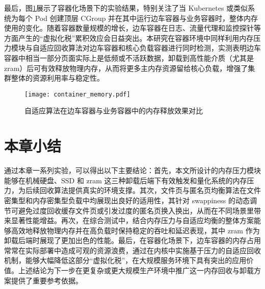 最后，图\ref{fig:container_memory}展示了容器化场景下的实验结果，特别关注了当 Kubernetes 或类似系统为每个 Pod 创建顶层 CGroup 并在其中运行边车容器与业务容器时，整体内存使用的变化。随着容器数量规模的增长，边车容器在日志、流量代理和监控探针等方面产生的“虚拟化税”累积效应会日益突出。本研究在容器环境中同样利用内存压力模块与自适应回收算法对边车容器和核心负载容器进行同时检测，实测表明边车容器中相当一部分页面实际上是低频或不活跃数据，卸载到高性能介质（尤其是 zram）后可有效释放物理内存，从而将更多主内存资源留给核心负载，增强了集群整体的资源利用率与稳定性。

\begin{figure}[htbp]
    \centering
    \texttt{[image: container\_memory.pdf]}
    \caption{自适应算法在边车容器与业务容器中的内存释放效果对比}
    \label{fig:container_memory}
\end{figure}

\section{本章小结}

通过本章一系列实验，可以得出以下主要结论：首先，本文所设计的内存压力模块能够在机械硬盘、SSD 和 zram 这三种卸载后端下有效触发和量化系统的内存压力，为后续回收算法提供真实的环境支撑。其次，文件页与匿名页均衡算法在文件密集型和内存密集型负载中均展现出良好的适用性，其针对  swappiness  的动态调节可避免过度回收缓存文件页或引发过度的匿名页换入换出，从而在不同场景里带来显著性能增益。再次，在综合测试中，结合内存压力与自适应均衡的整体方案能够高效地释放物理内存并在高负载时保持稳定的吞吐和延迟表现，其中 zram 作为卸载后端时展现了更加出色的性能。最后，在容器化场景下，边车容器的内存占用常常在实际部署中造成可观的资源浪费，通过在内核中实施基于压力的自适应回收机制，能够大幅降低这部分“虚拟化税”，在大规模服务环境下具有突出的应用价值。上述结论为下一步在更复杂或更大规模生产环境中推广这一内存回收与卸载方案提供了重要参考依据。
